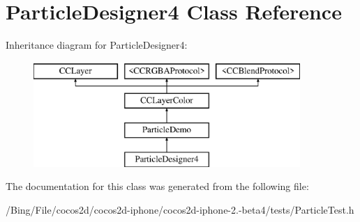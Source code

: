 \hypertarget{interface_particle_designer4}{\section{Particle\-Designer4 Class Reference}
\label{interface_particle_designer4}
}
Inheritance diagram for Particle\-Designer4\-:\begin{figure}[H]
\begin{center}
\leavevmode
\includegraphics[height=4.000000cm]{interface_particle_designer4}
\end{center}
\end{figure}


The documentation for this class was generated from the following file\-:\begin{DoxyCompactItemize}
\item 
/\-Bing/\-File/cocos2d/cocos2d-\/iphone/cocos2d-\/iphone-\/2.-\/beta4/tests/Particle\-Test.\-h\end{DoxyCompactItemize}
